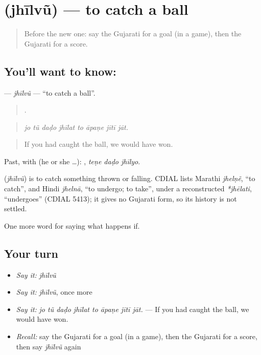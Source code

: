 \section[\texorpdfstring{\gu{ઝીલવું} (jhīlvũ)}{ઝીલવું (jhīlvũ)}]{ (jhīlvũ) — to catch a ball}

\label{lesson:GU-C549-jhilvu}



\begin{quote}
Before the new one: say the Gujarati for a goal (in a game), then the Gujarati for a score.
\end{quote}

\subsection*{You'll want to know: }
\textbf{} — \emph{jhīlvũ} — \textquotedblleft{}to catch a ball\textquotedblright{}.

\begin{quote}
       .
\end{quote}

\begin{quote}
\emph{jo tũ daḍo jhīlat to āpaṇe jītī jāt.}
\end{quote}

\begin{quote}
If you had caught the ball, we would have won.
\end{quote}

Past, with  (he or she …):   , \emph{teṇe daḍo jhīlyo}.

\begin{cousinweb}
\textbf{} (\emph{jhīlvũ}) is to catch something thrown or falling. CDIAL lists Marathi \emph{jhelṇẽ}, \textquotedblleft{}to catch\textquotedblright{}, and Hindi \emph{jhelnā}, \textquotedblleft{}to undergo; to take\textquotedblright{}, under a reconstructed \emph{*jhēlati}, \textquotedblleft{}undergoes\textquotedblright{} (CDIAL 5413); it gives no Gujarati form, so its history is not settled.
\end{cousinweb}

\begin{grammarlens}[title={What you've built}]
One more word for saying what happens if.
\end{grammarlens}

\subsection*{Your turn}
\begin{itemize}
\raggedright
  \item \emph{Say it:} \emph{jhīlvũ}
  \item \emph{Say it:} \emph{jhīlvũ}, once more
  \item \emph{Say it:} \emph{jo tũ daḍo jhīlat to āpaṇe jītī jāt.} — If you had caught the ball, we would have won.
  \item \emph{Recall:} say the Gujarati for a goal (in a game), then the Gujarati for a score, then say \emph{jhīlvũ} again
\end{itemize}

